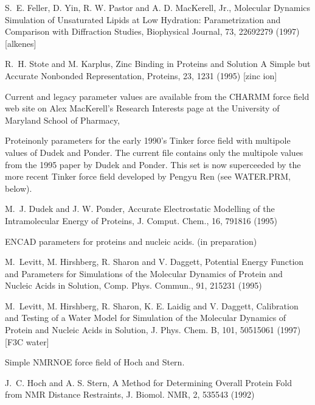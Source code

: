 \documentclass[letterpaper,11pt,english]{sphinxmanual}
\begin{document}
S. E. Feller, D. Yin, R. W. Pastor and A. D. MacKerell, Jr., Molecular Dynamics Simulation of Unsaturated Lipids at Low Hydration: Parametrization and Comparison with Diffraction Studies, Biophysical Journal, 73, 2269\sphinxhyphen{}2279 (1997)  {[}alkenes{]}

R. H. Stote and M. Karplus, Zinc Binding in Proteins and Solution \sphinxhyphen{} A Simple but Accurate Nonbonded Representation, Proteins, 23, 12\sphinxhyphen{}31 (1995)  {[}zinc ion{]}

Current and legacy parameter values are available from the CHARMM force field web site on Alex MacKerell’s  Research Interests page at the University of Maryland School of Pharmacy, 


Protein\sphinxhyphen{}only parameters for the early 1990’s Tinker force field with multipole values of Dudek and Ponder. The current file contains only the multipole values from the 1995 paper by Dudek and Ponder. This set is now superceeded by the more recent Tinker force field developed by Pengyu Ren (see WATER.PRM, below).

M. J. Dudek and J. W. Ponder, Accurate Electrostatic Modelling of the Intramolecular Energy of Proteins, J. Comput. Chem., 16, 791\sphinxhyphen{}816 (1995)


ENCAD parameters for proteins and nucleic acids.  (in preparation)

M. Levitt, M. Hirshberg, R. Sharon and V. Daggett, Potential Energy Function and Parameters for Simulations of the Molecular Dynamics of Protein and Nucleic Acids in Solution, Comp. Phys. Commun., 91, 215\sphinxhyphen{}231 (1995)

M. Levitt, M. Hirshberg, R. Sharon, K. E. Laidig and V. Daggett, Calibration and Testing of a Water Model for Simulation of the Molecular Dynamics of Protein and Nucleic Acids in Solution, J. Phys. Chem. B, 101, 5051\sphinxhyphen{}5061 (1997)  {[}F3C water{]}


Simple NMR\sphinxhyphen{}NOE force field of Hoch and Stern.

J. C. Hoch and A. S. Stern, A Method for Determining Overall Protein Fold from NMR Distance Restraints, J. Biomol. NMR, 2, 535\sphinxhyphen{}543 (1992)

\end{document}

